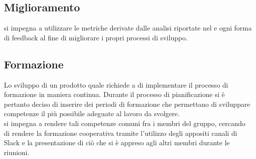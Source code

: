 \subsection{Miglioramento}
\groupName{} si impegna a utilizzare le metriche derivate dalle analisi riportate nel \docNameVersionPdQ{} e ogni forma di feedback al fine di migliorare i propri processi di sviluppo.

\subsection{Formazione}\label{subsection:formazione}
Lo sviluppo di un prodotto quale \projectName{} richiede a \groupName{} di implementare il processo di formazione in maniera continua. Durante il processo di pianificazione si è pertanto deciso di inserire dei periodi di formazione che permettano di sviluppare competenze il più possibile adeguate al lavoro da svolgere.\\
\groupName{} si impegna a rendere tali competenze comuni fra i membri del gruppo, cercando di rendere la formazione cooperativa tramite l'utilizzo degli appositi canali di Slack e la presentazione di ciò che si è appreso agli altri membri durante le riunioni.